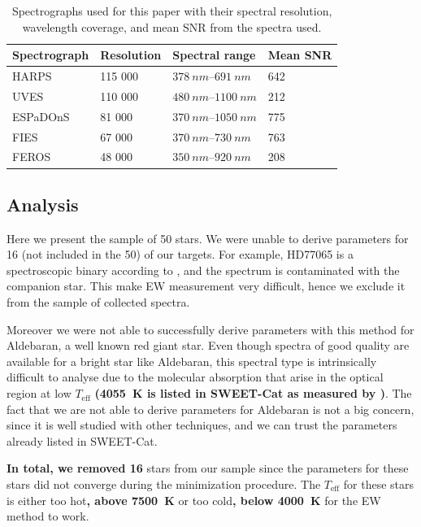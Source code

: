 \documentclass{aa}
\begin{document}
\begin{table}[htb!]
    \caption{Spectrographs used for this paper with their spectral resolution,
             wavelength coverage, and mean SNR from the spectra used.}
    \label{tab:instruments}
    \centering
    \begin{tabular}{llll}
      \hline\hline
      Spectrograph & Resolution & Spectral range              &   Mean SNR  \\
      \hline
      HARPS        &    115 000 & $\SIrange{378}{691}{nm}$    &   642       \\
      UVES         &    110 000 & $\SIrange{480}{1100}{nm}$   &   212       \\
      ESPaDOnS     &     81 000 & $\SIrange{370}{1050}{nm}$   &   775       \\
      FIES         &     67 000 & $\SIrange{370}{730}{nm}$    &   763       \\
      FEROS        &     48 000 & $\SIrange{350}{920}{nm}$    &   208       \\
      \hline
    \end{tabular}
\end{table}



\subsection{Analysis}
\label{sec:results}
Here we present the sample of 50 stars. We were unable to derive parameters for
{16 (not included in the 50)} of our targets. For example, HD77065 is a
spectroscopic binary according to \cite{Pourbaix2004}, and the spectrum is
contaminated with the companion star. This make EW measurement very difficult,
hence we exclude it from the sample of collected spectra.

Moreover we were not able to successfully derive parameters with this method for
Aldebaran, a well known red giant star. Even though spectra of good quality are
available for a bright star like Aldebaran, this spectral type is intrinsically
difficult to analyse due to the molecular absorption that arise in the optical
region at low $T_\mathrm{eff}$ {\bf (\SI{4055}{K} is listed in SWEET-Cat as
measured by \citet{Hatzes2015})}. The fact that we are not able to derive
parameters for Aldebaran is not a big concern, since it is well studied with
other techniques, and we can trust the parameters already listed in SWEET-Cat.

{\bf In total, we removed 16} stars from our sample since the parameters for
these stars did not converge during the minimization procedure. The
$T_\mathrm{eff}$ for these stars is either too hot{\bf , above \SI{7500}{K}} or
too cold{\bf , below \SI{4000}{K}} for the EW method to work.
\end{document}
